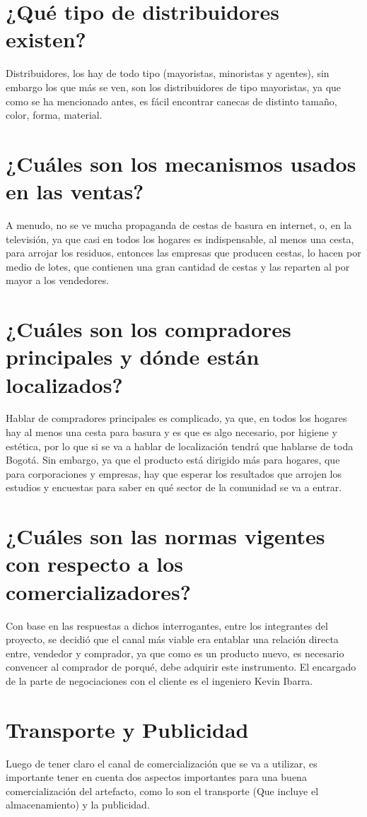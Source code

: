 \documentclass{report}
\begin{document}
    \section{¿Qué tipo de distribuidores existen?}
    Distribuidores, los hay de todo tipo (mayoristas, minoristas y agentes), sin embargo los que más se ven, son los distribuidores de tipo mayoristas, ya que como se ha mencionado antes, es fácil encontrar canecas de distinto tamaño, color, forma, material.

    \section{¿Cuáles son los mecanismos usados en las ventas?}
    A menudo, no se ve mucha propaganda de cestas de basura en internet, o, en la televisión, ya que casi en todos los hogares es indispensable, al menos una cesta, para arrojar los residuos, entonces las empresas que producen cestas, lo hacen por medio de lotes, que contienen una gran cantidad de cestas y las reparten al por mayor a los vendedores.

    \section{¿Cuáles son los compradores principales y dónde están localizados?}
    Hablar de compradores principales es complicado, ya que, en todos los hogares hay al menos una cesta para basura y es que es algo necesario, por higiene y estética, por lo que si se va a hablar de localización tendrá que hablarse de toda Bogotá. Sin embargo, ya que el producto está dirigido más para hogares, que para corporaciones y empresas, hay que esperar los resultados que arrojen los estudios y encuestas para saber en qué sector de la comunidad se va a entrar.

    \section{¿Cuáles son las normas vigentes con respecto a los comercializadores?}

    Con base en las respuestas a dichos interrogantes, entre los integrantes del proyecto, se decidió que el canal más viable era entablar una relación directa entre, vendedor y comprador, ya que como es un producto nuevo, es necesario convencer al comprador de porqué, debe adquirir este instrumento. El encargado de la parte de negociaciones con el cliente es el ingeniero Kevin Ibarra.

    \section{Transporte y Publicidad}
    Luego de tener claro el canal de comercialización que se va a utilizar, es importante tener en cuenta dos aspectos importantes para una buena comercialización del artefacto, como lo son el transporte (Que incluye el almacenamiento) y la publicidad.
\end{document}

